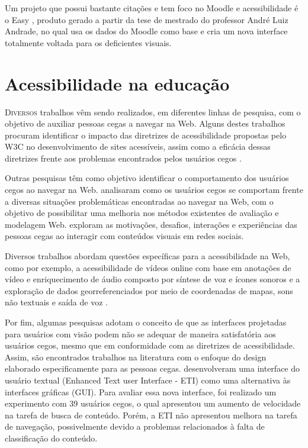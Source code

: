 Um projeto que possui bastante citações e tem foco no Moodle e acessibilidade é 
o Easy \cite{rezende2005abaco}, produto gerado a partir da tese de mestrado do professor André Luiz Andrade, no qual usa os dados do Moodle como base e cria um nova interface totalmente voltada para os deficientes visuais.

\section{Acessibilidade na educação}
\lettrine{D}{iversos} trabalhos vêm sendo realizados, em diferentes linhas de pesquisa, com o objetivo de auxiliar pessoas cegas a 
navegar na Web. Alguns destes trabalhos procuram identificar o impacto das diretrizes de acessibilidade propostas pelo 
W3C no desenvolvimento de sites acessíveis, assim como a eficácia dessas diretrizes frente aos problemas encontrados 
pelos usuários cegos \cite{4ce5a8d646ac449e98d079b8f6c3a7c5} \cite{Power2012}.

Outras pesquisas têm como objetivo identificar o comportamento dos usuários cegos ao navegar na Web. 
\cite{Vigo2013} analisaram como os usuários cegos se comportam frente a diversas situações problemáticas 
encontradas ao navegar na Web, com o objetivo de possibilitar uma melhoria nos métodos existentes de avaliação 
e modelagem Web. \cite{Voykinska2016} exploram as motivações, desafios, interações e experiências das 
pessoas cegas ao interagir com conteúdos visuais em redes sociais.

Diversos trabalhos abordam questões específicas para a acessibilidade na Web, como por exemplo, 
a acessibilidade de vídeos online com base em anotações de vídeo e enriquecimento de áudio composto por 
síntese de voz e ícones sonoros \cite{Encelle2011} e a exploração de dados georreferenciados 
por meio de coordenadas de mapas, sons não textuais e saída de voz \cite{Zhao2008}.

Por fim, algumas pesquisas adotam o conceito de que as interfaces projetadas para usuários com 
visão podem não se adequar de maneira satisfatória aos usuários cegos, mesmo que em conformidade 
com as diretrizes de acessibilidade. Assim, são encontrados trabalhos na literatura com o enfoque 
do design elaborado especificamente para as pessoas cegas. \cite{Press2008} desenvolveram uma 
interface do usuário textual (Enhanced Text user Interface - ETI) como uma alternativa 
às interfaces gráficas (GUI). Para avaliar essa nova interface, foi realizado um experimento com 39 
usuários cegos, o qual apresentou um aumento de velocidade na tarefa de busca de conteúdo. Porém, a 
ETI não apresentou melhora na tarefa de navegação, possivelmente devido a problemas relacionados à 
falta de classificação do conteúdo.

